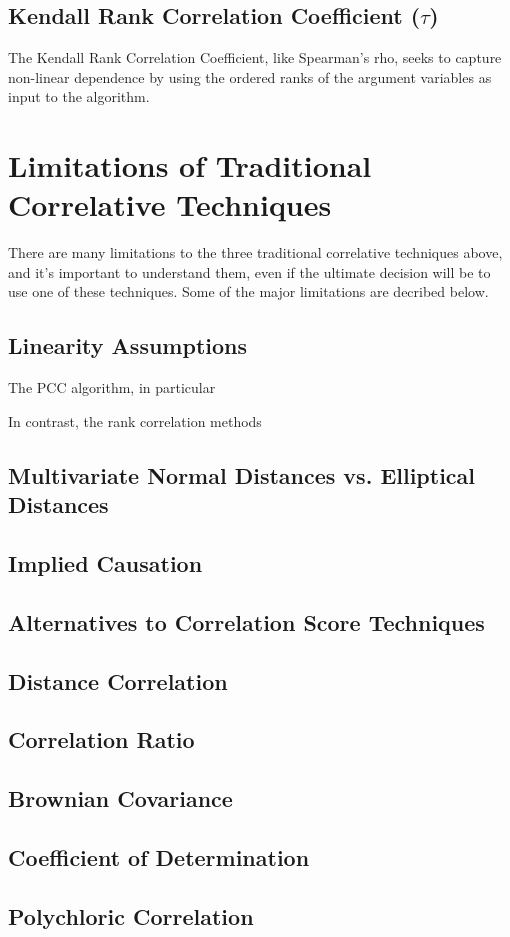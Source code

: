 \subsection{Kendall Rank Correlation Coefficient ($\tau$)}

The Kendall Rank Correlation Coefficient, like Spearman's rho, seeks to capture non-linear dependence by using the ordered ranks of the argument variables as input to the algorithm.

\section{Limitations of Traditional Correlative Techniques}

There are many limitations to the three traditional correlative techniques above, and it's important to understand them, even if the ultimate decision will be to use one of these techniques. Some of the major limitations are decribed below.

\subsection{Linearity Assumptions}

The PCC algorithm, in particular

In contrast, the rank correlation methods 

\subsection{Multivariate Normal Distances vs. Elliptical Distances}

\subsection{Implied Causation}

\subsection{Alternatives to Correlation Score Techniques}



\subsection{Distance Correlation}

\subsection{Correlation Ratio}

\subsection{Brownian Covariance}

\subsection{Coefficient of Determination}

\subsection{Polychloric Correlation}